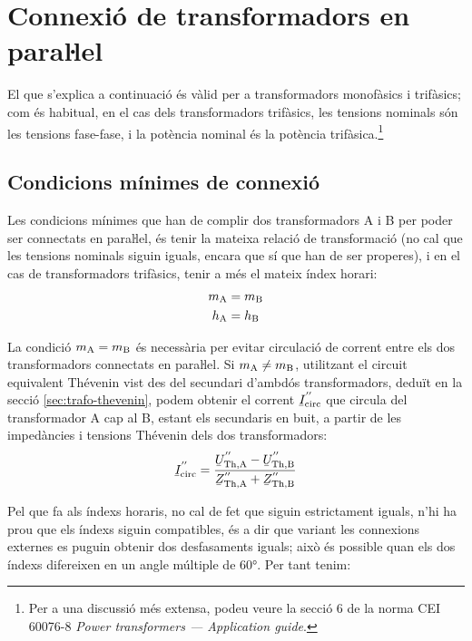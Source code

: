 \section{\texorpdfstring{Connexió de transformadors en paraŀlel}{Connexió de transformadors en paral-lel}}

El que s'explica a continuació és vàlid per a transformadors
monofàsics i trifàsics; com és habitual, en el cas dels
transformadors trifàsics, les tensions nominals són les tensions
fase-fase, i la potència nominal és la potència trifàsica.\footnote{Per a una discussió més extensa,  podeu veure la secció 6 de la norma CEI 60076-8 \emph{Power transformers --- Application guide}.}

\subsection{Condicions mínimes de connexió}

Les condicions mínimes que han de complir dos transformadors A i B per poder ser connectats en paraŀlel, és tenir la mateixa relació de transformació (no cal que les tensions nominals siguin iguals, encara que sí que han de ser properes), i en el cas de transformadors trifàsics, tenir a més el mateix índex horari:
\begin{align}
    m_\mathrm{A} &= m_\mathrm{B}\\
    h_\mathrm{A} &= h_\mathrm{B}
\end{align}

La condició $m_\mathrm{A} = m_\mathrm{B}$ és necessària per evitar circulació de corrent entre els dos transformadors connectats en paraŀlel. Si $m_\mathrm{A} \neq m_\mathrm{B}$, utilitzant el circuit equivalent  Thévenin vist des del secundari d'ambdós transformadors, deduït en la secció \vref{sec:trafo-thevenin}, podem obtenir el corrent $\cmplx{I}\ped{circ}^{''}$ que circula del transformador A cap al B, estant els secundaris en buit, a partir de les impedàncies i tensions Thévenin dels dos transformadors:
\begin{equation}
    \cmplx{I}\ped{circ}^{''} = \frac{\cmplx{U}\ped{Th,A}^{''}-\cmplx{U}\ped{Th,B}^{''}}{\cmplx{Z}\ped{Th,A}^{''}+
    \cmplx{Z}\ped{Th,B}^{''}}
\end{equation}

Pel que fa als índexs horaris, no cal de fet que siguin estrictament iguals, n'hi ha prou  que els índexs siguin compatibles, és a dir que variant les connexions externes es puguin obtenir dos desfasaments iguals; això és possible quan els dos índexs difereixen en un angle múltiple de \ang{60}. Per tant tenim:

